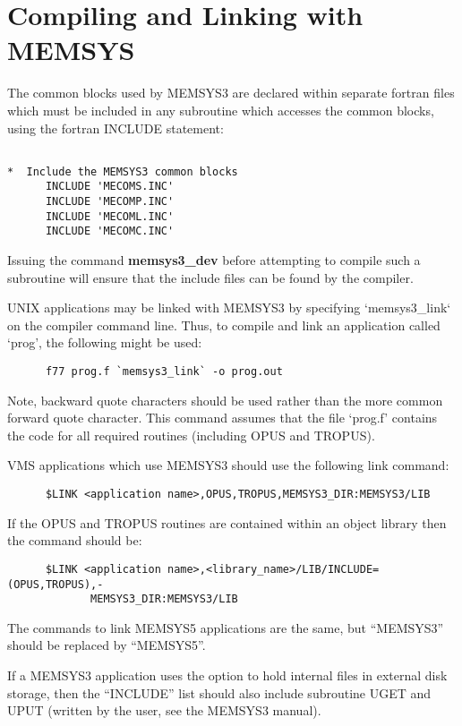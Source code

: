\section {Compiling and Linking with MEMSYS}
The common blocks used by MEMSYS3 are declared within separate fortran files
which must be included in any subroutine which accesses the common blocks,
using the fortran INCLUDE statement:

\begin{verbatim}

*  Include the MEMSYS3 common blocks
      INCLUDE 'MECOMS.INC'   
      INCLUDE 'MECOMP.INC'   
      INCLUDE 'MECOML.INC'   
      INCLUDE 'MECOMC.INC'   
\end{verbatim}

Issuing the command {\bf memsys3\_dev} before attempting to compile such a
subroutine will ensure that the include files can be found by the
compiler.

UNIX applications may be linked with MEMSYS3 by specifying `memsys3\_link` 
on the compiler command line. Thus, to compile and link an application 
called `prog', the following might be used: 

\begin{verbatim}
      f77 prog.f `memsys3_link` -o prog.out
\end{verbatim}

Note, backward quote characters should be used rather than the more common 
forward quote character. This command assumes that the file `prog.f' contains 
the code for all required routines (including OPUS and TROPUS).

VMS applications which use MEMSYS3 should use the following link command:

\begin{verbatim}
      $LINK <application name>,OPUS,TROPUS,MEMSYS3_DIR:MEMSYS3/LIB
\end{verbatim}

If the OPUS and TROPUS routines are contained within an object library then the 
command should be:

\begin{verbatim}
      $LINK <application name>,<library_name>/LIB/INCLUDE=(OPUS,TROPUS),-
             MEMSYS3_DIR:MEMSYS3/LIB
\end{verbatim}

The commands to link MEMSYS5 applications are the same, but ``MEMSYS3'' should
be replaced by ``MEMSYS5''.


If a MEMSYS3 application uses the option to hold internal files in external
disk  storage, then the ``INCLUDE'' list should also include subroutine UGET
and UPUT  (written by the user, see the MEMSYS3 manual).

